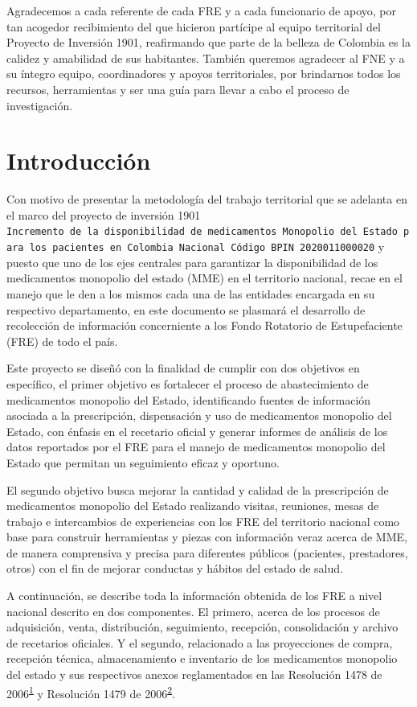 \documentclass[
]{book}
\begin{document}
Agradecemos a cada referente de cada FRE y a cada funcionario de apoyo, por tan acogedor recibimiento del que hicieron partícipe al equipo territorial del Proyecto de Inversión 1901, reafirmando que parte de la belleza de Colombia es la calidez y amabilidad de sus habitantes. También queremos agradecer al FNE y a su íntegro equipo, coordinadores y apoyos territoriales, por brindarnos todos los recursos, herramientas y ser una guía para llevar a cabo el proceso de investigación.

\hypertarget{introducciuxf3n}{%
\chapter{Introducción}\label{introducciuxf3n}}

Con motivo de presentar la metodología del trabajo territorial que se adelanta en el marco del proyecto de inversión 1901 \texttt{Incremento\ de\ la\ disponibilidad\ de\ medicamentos\ Monopolio\ del\ Estado\ para\ los\ pacientes\ en\ Colombia\ Nacional\ Código\ BPIN\ 2020011000020} y puesto que uno de los ejes centrales para garantizar la disponibilidad de los medicamentos monopolio del estado (MME) en el territorio nacional, recae en el manejo que le den a los mismos cada una de las entidades encargada en su respectivo departamento, en este documento se plasmará el desarrollo de recolección de información concerniente a los Fondo Rotatorio de Estupefaciente (FRE) de todo el país.

Este proyecto se diseñó con la finalidad de cumplir con dos objetivos en específico, el primer objetivo es fortalecer el proceso de abastecimiento de medicamentos monopolio del Estado, identificando fuentes de información asociada a la prescripción, dispensación y uso de medicamentos monopolio del Estado, con énfasis en el recetario oficial y generar informes de análisis de los datos reportados por el FRE para el manejo de medicamentos monopolio del Estado que permitan un seguimiento eficaz y oportuno.

El segundo objetivo busca mejorar la cantidad y calidad de la prescripción de medicamentos monopolio del Estado realizando visitas, reuniones, mesas de trabajo e intercambios de experiencias con los FRE del territorio nacional como base para construir herramientas y piezas con información veraz acerca de MME, de manera comprensiva y precisa para diferentes públicos (pacientes, prestadores, otros) con el fin de mejorar conductas y hábitos del estado de salud.

A continuación, se describe toda la información obtenida de los FRE a nivel nacional descrito en dos componentes. El primero, acerca de los procesos de adquisición, venta, distribución, seguimiento, recepción, consolidación y archivo de recetarios oficiales. Y el segundo, relacionado a las proyecciones de compra, recepción técnica, almacenamiento e inventario de los medicamentos monopolio del estado y sus respectivos anexos reglamentados en las Resolución 1478 de 2006\textsuperscript{\protect\hyperlink{ref-MSPS1478-2006}{1}} y Resolución 1479 de 2006\textsuperscript{\protect\hyperlink{ref-MSPS1479-2006}{2}}.
\end{document}
